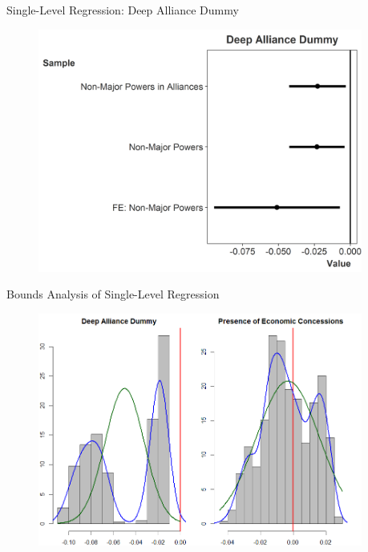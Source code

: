 \documentclass[12pt]{beamer}
\begin{document}

\begin{frame}{Single-Level Regression: Deep Alliance Dummy}


\begin{figure}[htbp]
	\centering
		\includegraphics[width=0.95\textwidth]{single-level-dummy.png}
\end{figure}


\end{frame}





\begin{frame}{Bounds Analysis of Single-Level Regression}

\begin{figure}[htbp]
	\centering
		\includegraphics[width=0.95\textwidth]{eba-single-level.png}
\end{figure}


\end{frame}









\end{document}
